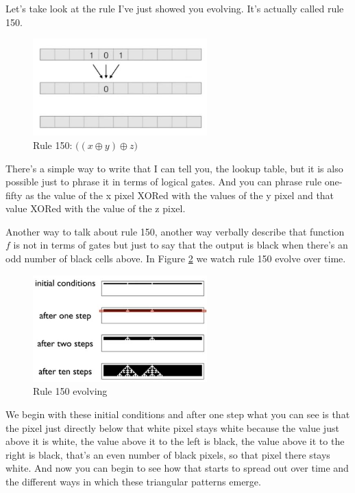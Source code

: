 \documentclass[]{article}
\newcommand*\xor{\oplus}
\begin{document}
Let's take look at the rule I've just showed you evolving. It's actually called rule 150.
\begin{figure}[H]
	\begin{center}
		\caption{Rule 150: $\big((x \xor y) \xor z\big)$}\label{fig:cellular-automaton-rule-2}
		\includegraphics[width=0.6\textwidth]{cellular-automaton-rule-2}
	\end{center}
\end{figure}
There's a simple way to write that I can tell you, the lookup table, but it is also possible just to phrase it in terms of logical gates.
And you can phrase rule one-fifty as the value
of the x pixel XORed with the values of the y pixel and that value XORed with the value of the z pixel. 

Another way to talk about rule 150, another way verbally describe that function $f$ is not in terms of gates but just to say that the output is black when there's an odd number of black cells above.
In Figure \ref{fig:cellular-automaton-rule-3} we  watch rule 150 evolve over time.
\begin{figure}[H]
	\begin{center}
		\caption{Rule 150 evolving}\label{fig:cellular-automaton-rule-3}
		\includegraphics[width=0.6\textwidth]{cellular-automaton-rule-3}
	\end{center}
\end{figure}
We begin with these initial conditions and after one step what you can see is that the pixel just directly below that white pixel stays white because the value just above it is white, the value above it to the left is black, the value above it to the right is black, that's an even number of black pixels, so that pixel there stays white.
And now you can begin to see how that starts to spread out over time and the different ways in which these triangular patterns emerge.
\end{document}
